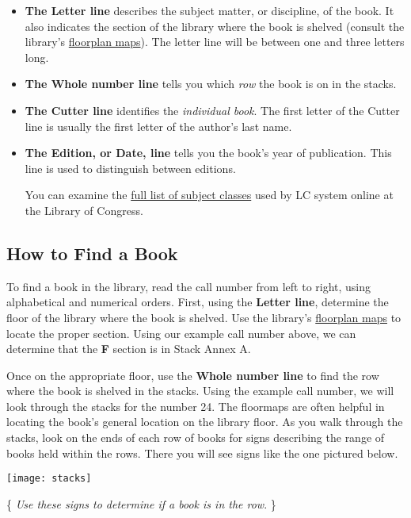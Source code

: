 \begin{itemize}

\item \textbf{The Letter line} describes the subject matter, or
discipline, of the book. It also indicates the section of the library where the
book is shelved (consult the library's \href{http://www.dartmouth.edu/~library/bakerberry/circ/stacksguides/}{floorplan
maps}). The letter line will be between one and three letters long. \item \textbf{The Whole number
line} tells you which \emph{row} the book is on in the stacks.  \item
\textbf{The Cutter line} identifies the \emph{individual book}. The first
letter of the Cutter line is usually the first letter of the author's last name.
\item \textbf{The Edition, or Date, line} tells you the book's year of
publication. This line is used to distinguish between editions.\bigskip

You can examine the \href{https://www.loc.gov/catdir/cpso/lcco/}{full list of subject classes} used by LC system online at the Library of Congress.\end{itemize}

\subsection{How to Find a Book} \smallskip

To find a book in the library, read the call number from left to right, using  alphabetical and
numerical orders. First, using the \textbf{Letter line},  determine the floor of
the library where the book is shelved. Use the library's
\href{http://www.dartmouth.edu/~library/bakerberry/circ/stacksguides/}{floorplan
maps}  to locate the proper section. Using our example call number above, we can
determine that the \textbf{F} section is in Stack Annex A.

Once on the appropriate floor, use the \textbf{Whole number line} to find the
row where the book is shelved in the stacks. Using the example call number, we
will look through the stacks for the number 24. The floormaps are often helpful
in locating the book's general location on the library floor. As you walk
through the stacks, look on the ends of each row of books for signs describing
the range of books held within the rows. There you will see signs like the one
pictured below.

\begin{center}\texttt{[image: stacks]}

{\small \{ \emph{Use these signs to determine if a book is in the row}. \}}

\end{center}



